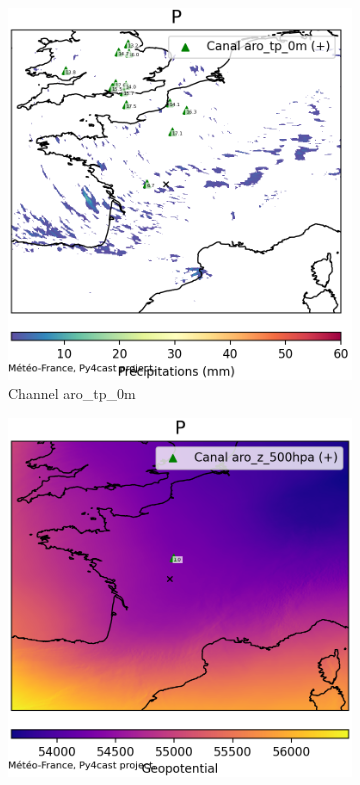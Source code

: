   
\begin{figure}[h]
    \centering
    \begin{subfigure}[b]{0.49\textwidth}
        \includegraphics[width=\textwidth]{Images/titan_rain_anchors/nov-21/complete-arp/2023112100_feature_aro_tp_0m.png}
        \caption{Channel aro\_tp\_0m}
    \end{subfigure}
    \hfill
    \begin{subfigure}[b]{0.49\textwidth}
        \includegraphics[width=\textwidth]{Images/titan_rain_anchors/nov-21/complete-arp/2023112100_feature_aro_z_500hpa.png}

\end{subfigure}
\end{figure}
